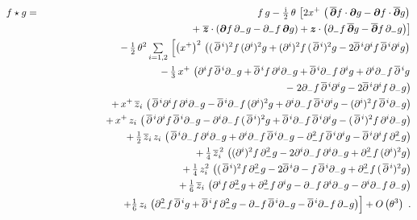 \documentclass[11pt,a4paper]{article}
\def\nn{\nonumber}
\def\d{\partial}
\newcommand{\1}{\mathbb{1}}
\newcommand{\mbf}[1]{{\boldsymbol {#1} }}
\def\ii{{\,{\rm i}\,}}
\def\mz{{\mbf z}}
\def\mdell{{\mbf\partial}}
\def\nn{\nonumber}
\def\d{\partial}
\begin{document}
\begin{eqnarray}
  \label{eq:weyl:positionspace}
  f\star g&=&f\,g-\mbox{$\frac{\ii}2$}\,\theta\,\left[
  2x^+\,\left(\,\overline{\mdell}f\cdot\mdell g
  - \mdell f\cdot\overline{\mdell}g\right)\right.\\\nonumber
  &&\qquad\qquad\qquad+\left.\overline{\mz}\cdot\left(\mdell f\,\d_- g
  - \d_- f\,\mdell g\right)+ \mz\cdot\left(\d_- f\,\overline{\mdell}g
   - \overline{\mdell}f\,\d_- g\right)\right]\\ \nonumber
  &&-\,\mbox{$\frac1{2}$}\,\theta^2\,\mbox{$\sum\limits_{i=1,2}$}\,\left[
  \left(x^+\right)^2\,
  \left((\,\overline{\d}{}^{\,i})^2f\,(\d^i)^2g
  +(\d^i)^2f\,(\,\overline{\d}{}^{\,i})^2g
  -2\overline{\d}{}^{\,i}\d^if\,\overline{\d}{}^{\,i}\d^ig
  \right)\right.\\ \nonumber &&\qquad\qquad\quad\quad
  -\,\mbox{$\frac13$}\,x^+\,\left(\d^if\,\overline{\d}{}^{\,i}\d_- g
  +\overline{\d}{}^{\,i}f\,\d^i\d_- g
  +\overline{\d}{}^{\,i}\d_- f\,\d^ig
  +\d^i\d_- f\,\overline{\d}{}^{\,i}g\right.\\ \nonumber
  &&\qquad\qquad\qquad\qquad\qquad\quad\quad
  -\left.2\partial_-f\,\overline{\d}{}^{\,i}
  \d^ig-2\overline{\d}{}^{\,i}\partial^if\,
  \partial_-g\right)\\\nonumber&&\qquad\qquad\quad\quad
  +\,x^+\,\overline{z}_i\,\left(\,\overline{\d}{}^{\,i}
  \d^if\,\d^i\d_- g
  -\overline{\d}{}^{\,i}\d_- f\,(\d^i)^2g
  +\d^i\d_- f\,\overline{\d}{}^{\,i}\d^ig
  -(\d^i)^2f\,\overline{\d}{}^{\,i}\d_- g\right)
  \\ \nonumber &&\qquad\qquad\quad\quad
  +\,x^+\,z_i\,\left(\,\overline{\d}{}^{\,i}\d^if\,\overline{\d}{}^{\,i}\d_- g
  -\d^i\d_- f\,(\,\overline{\d}{}^{\,i})^2g
  +\overline{\d}{}^{\,i}\d_- f\,\overline{\d}{}^{\,i}\d^ig
  -(\,\overline{\d}{}^{\,i})^2f\,\d^i\d_- g\right)\\ \nonumber
  &&\qquad\qquad\quad\quad
  +\,\mbox{$\frac12$}\,\overline{z}_i\,z_i\,\left(\,
  \overline{\d}{}^{\,i}\d_- f\,\d^i\d_- g
  +\d^i\d_- f\,\overline{\d}{}^{\,i}\d_- g
  -\d_- ^2f\,\overline{\d}{}^{\,i}\d^ig
  -\overline{\d}{}^{\,i}\d^if\,\d_-^2g\right)
  \\ \nonumber &&\qquad\qquad\quad\quad
  +\,\mbox{$\frac14$}\,\overline{z}_i^{\,2}\,
  \left((\d^i)^2f\,\d_-^2g
  -2\d^i\d_- f\,\d^i\d_- g
  +\d_-^2f\,(\d^i)^2g\right)\\ \nonumber &&\qquad\qquad\quad\quad
  +\,\mbox{$\frac14$}\,z_i^2\,
  \left((\,\overline{\d}{}^{\,i})^2f\,\d_-^2g
  -2\overline{\d}{}^{\,i}\d- f\,\overline{\d}{}^{\,i}\d_- g
  +\d_-^2f\,(\,\overline{\d}{}^{\,i})^2g\right)
  \\ \nonumber &&\qquad\qquad\quad\quad
  +\,\mbox{$\frac16$}\,\overline{z}_i\,\left(\d^if\,\d_-^2g
  +\d_-^2f\,\d^ig-\partial_-f\,\partial^i
  \partial_-g-\partial^i\partial_-f\,\partial_-g\right)
  \\&&\qquad\qquad\quad\quad
  +\Bigl.\mbox{$\frac16$}\,z_i\,\left(\d_-^2f\,\overline{\d}{}^{\,i}g
  +\overline{\d}{}^{\,i}f\,\d_-^2g-\partial_-f\,\overline{\partial}{}^{\,i}\d_-g-
  \overline{\d}{}^{\,i}\d_-f\,\d_-g\right)
  \Bigr]+O\left(\theta^3\right) \ . \nn\\ &&
\end{eqnarray}
\end{document}
